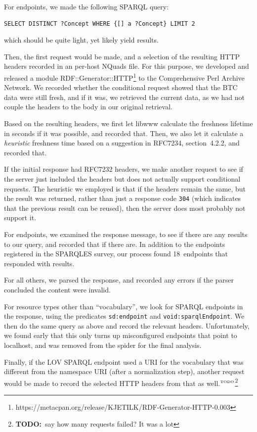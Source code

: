 \documentclass{llncs}
\newcommand{\rdfterm}[1]{\texttt{#1}}
\newcommand{\httph}[1]{\texttt{#1}}
\newcommand{\todo}[1]{\ensuremath{^{\textrm{\tiny{TODO}\normalsize}}}\footnote{\textbf{TODO:}~#1}}
\begin{document}
\begin{subappendices}
\begin{table}
\begin{tabular}{ | l |  p{3cm} | p{5cm} |}
    \hline
    \end{tabular}
\end{table}


For endpoints, we made the following SPARQL query:
\begin{verbatim}
SELECT DISTINCT ?Concept WHERE {[] a ?Concept} LIMIT 2
\end{verbatim}
which should be quite light, yet likely yield results.

Then, the first request would be made, and a selection of the
resulting HTTP headers recorded in an per-host NQuads file. For this
purpose, we developed and released a module
RDF::Generator::HTTP\footnote{https://metacpan.org/release/KJETILK/RDF-Generator-HTTP-0.003}
to the Comprehensive Perl Archive Network. We recorded whether the
conditional request showed that the BTC data were still fresh, and if
it was, we retrieved the current data, as we had not couple the
headers to the body in our original retrieval.

Based on the resulting headers, we first let libwww calculate the
freshness lifetime in seconds if it was possible, and recorded
that. Then, we also let it calculate a \emph{heuristic} freshness
time based on a suggestion in RFC7234, section~4.2.2, and recorded that.

If the initial response had RFC7232 headers, we make another
request to see if the server just included the headers but does not
actually support conditional requests. The heuristic we employed is
that if the headers remain the same, but the result was returned,
rather than just a response code \httph{304} (which indicates that the
previous result can be reused), then the server does most probably not
support it.

For endpoints, we examined the response message, to see if there are
any results to our query, and recorded that if there are. In addition
to the endpoints registered in the SPARQLES survey, our process found
18~endpoints that responded with results.

For all others, we parsed the response, and recorded any errors if the
parser concluded the content were invalid.

For resource types other than ``vocabulary'', we look for SPARQL
endpoints in the response, using the predicates \rdfterm{sd:endpoint}
and \rdfterm{void:sparqlEndpoint}. We then do the same query as above
and record the relevant headers. Unfortunately, we found early that
this only turns up misconfigured endpoints that point to localhost,
and was removed from the spider for the final analysis.

Finally, if the LOV SPARQL endpoint used a URI for the vocabulary that
was different from the namespace URI (after a normalization step),
another request would be made to record the selected HTTP headers from
that as well.\todo{say how many requests failed? It was a lot}
\end{subappendices}
\end{document}

